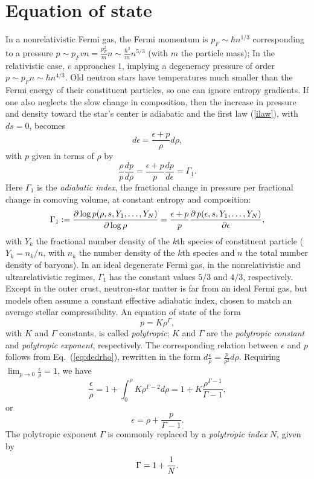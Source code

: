 \documentclass[12pt]{article}
\def\ep{\epsilon}
\def\be{\begin{equation}}
\def\ee{\end{equation}}
\newcommand{\pa}{\partial}
\begin{document}
\section{Equation of state}

%
In a nonrelativistic Fermi gas, the  Fermi momentum is $p_F\sim \hbar n^{1/3}$ corresponding to a pressure $\displaystyle p\sim p_F v n=\frac{p_F^2}{m} n 
        \sim \frac{\hbar^2}{m}n^{5/3}$ (with $m$ the particle mass); In the 
relativistic case, $v$ approaches $1$, implying a degeneracy pressure 
of order $\displaystyle p\sim p_F n \sim \hbar n^{4/3}$.
Old neutron stars have temperatures much
smaller than the Fermi energy of their constituent particles, so one
can ignore entropy gradients. If one also  neglects the slow change in
composition, then the increase in 
pressure and density toward the star's center
is adiabatic and the first law (\ref{ilaw}),
with $ds=0$,
becomes
\be 
d\epsilon = \frac{\epsilon+p}{\rho} d\rho, 
\label{eq:dedrho}\ee
with $p$ given in terms of $\rho$ by 
\be 
 \frac\rho p \frac{dp}{d\rho}  = \frac{\epsilon+p}{p}\frac{dp}{d \epsilon} 
= \Gamma_1.
\label{eq:dpdrho}\ee
{}
Here $\Gamma_1$ is the {\it adiabatic index}, the fractional  
change in pressure per fractional change in comoving volume, at 
constant entropy and composition:
\be
\Gamma_1 := {\pa\log p(\rho,s,Y_1,\ldots,Y_N)\over{\pa\log \rho}} 
        = {\ep +p\over p} {\pa\, p(\ep,s,Y_1,\ldots,Y_N)\over{\pa\ep}},  
\label{thel}
\ee
with $Y_k$ the fractional number density of the $k$th species of constituent 
particle ($Y_k = n_k/n$, with $n_k$ the number density of the $k$th species 
and $n$ the total number density of baryons).  
In an ideal degenerate Fermi gas, in the nonrelativistic and 
ultrarelativistic regimes, $\Gamma_1$ has the constant 
values $5/3$ and $4/3$, respectively.   
Except in the outer crust, neutron-star matter is far from an ideal Fermi 
gas, but models often assume a constant effective adiabatic index, chosen to 
match an average stellar compressibility.  An equation of state of the 
form 
\be 
        p = K \rho^\Gamma,
\label{eq:gamma}
\ee 
with $K$ and $\Gamma$ constants, is called {\it polytropic};
$K$ and $\Gamma$ are the {\it polytropic constant} and {\it polytropic
exponent}, respectively. 
The corresponding relation between $\epsilon$ and $p$ follows from 
Eq.~(\ref{eq:dedrho}), rewritten in the form 
$\displaystyle d\frac\epsilon\rho = \frac p{\rho^2} d\rho$.  Requiring 
$\displaystyle\lim_{p\rightarrow 0} \frac\epsilon\rho = 1$, we have  
\[
 \frac\epsilon\rho = 1+ \int_0^\rho K \rho^{\Gamma-2} d\rho 
 = 1+ K\frac {\rho^{\Gamma-1}}{\Gamma-1},
\] 
or 
\be 
        \epsilon = \rho + \frac{p}{\Gamma-1}.
\label{eq:polytrope}\ee
The polytropic exponent $\Gamma$ is commonly 
replaced by a {\em polytropic index} $N$, given by   
\begin{equation}
  \Gamma=1+\frac{1}{N}.
\index{polytrope!polytropic index}\end{equation}
\end{document}
